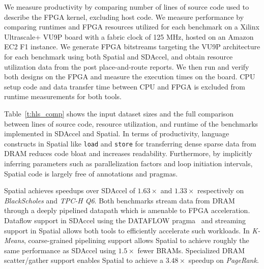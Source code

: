 We measure productivity by comparing number of lines of source code used to describe the FPGA kernel, excluding host code. We measure performance by comparing runtimes and FPGA resources utilized for each benchmark on a Xilinx Ultrascale+ VU9P board with a fabric clock of 125 MHz, hosted on an Amazon EC2 F1 instance. We generate FPGA bitstreams targeting the VU9P architecture for each benchmark using both Spatial and SDAccel, and obtain resource utilization data from the post place-and-route reports. We then run and verify both designs on the FPGA and measure the execution times on the board. CPU setup code and data transfer time between CPU and FPGA is excluded from runtime measurements for both tools.

Table~\ref{t:hls_comp} shows the input dataset sizes and the full comparison between lines of source code, resource utilization, and runtime of the benchmarks implemented in SDAccel and Spatial.
In terms of productivity, language constructs in Spatial like \texttt{\small{load}} and \texttt{\small{store}} for transferring dense sparse data from DRAM reduces code bloat and increases readability.
Furthermore, by implicitly
inferring parameters such as parallelization factors and loop initiation intervals, Spatial code is largely free of annotations and pragmas.

Spatial achieves speedups over SDAccel of $1.63\times$ and $1.33\times$ respectively on \emph{BlackScholes} and \emph{TPC-H Q6}. Both benchmarks
stream data from DRAM through a deeply pipelined datapath which is amenable to FPGA acceleration. Dataflow support in SDAccel using the DATAFLOW pragma~\cite{dataflowRef} and streaming support in Spatial allows both tools to efficiently accelerate such workloads. In \emph{K-Means}, coarse-grained pipelining support allows Spatial to achieve roughly the same performance as SDAccel using $1.5\times$ fewer BRAMs.
Specialized DRAM scatter/gather support enables Spatial to achieve a $3.48\times$ speedup on \emph{PageRank}.

